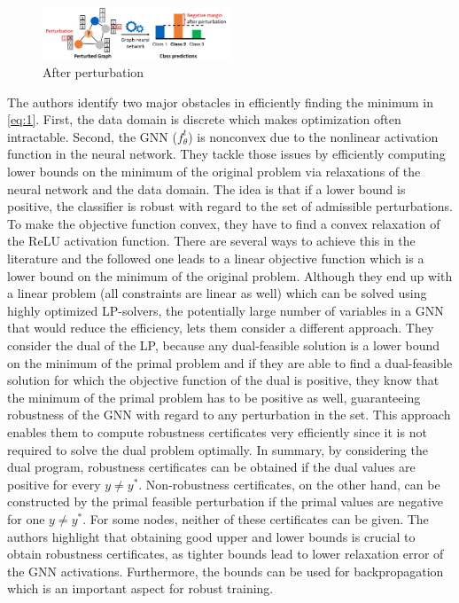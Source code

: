 \documentclass[a4paper,preprint]{sig-alternate}
\begin{document}
\begin{figure}[h]
    \centering
    \includegraphics[width=0.5\textwidth]{img/after_pert.png}
    \caption{After perturbation \cite{Zuegner_2019}}
    \label{fig:after_pert}
\end{figure}

The authors identify two major obstacles in efficiently finding the minimum in \ref{eq:1}.
First, the data domain is discrete which makes optimization often intractable. Second, the GNN ($f_{\theta}^t$) is nonconvex
due to the nonlinear activation function in the neural network. They tackle those issues by efficiently computing lower bounds
on the minimum of the original problem via relaxations of the neural network and the data domain.
The idea is that if a lower bound is positive, the classifier is robust with regard to the set of admissible perturbations.
To make the objective function convex, they have to find a convex relaxation of the ReLU activation function. There are several ways to achieve this in the literature and the followed one leads to a linear objective function which is a lower bound on the minimum of the original problem.
Although they end up with a linear problem (all constraints are linear as well) which can be solved using highly optimized LP-solvers,
the potentially large number of variables in a GNN that would reduce the efficiency, lets them consider a different approach.
They consider the dual of the LP, because any dual-feasible solution is a lower bound on the minimum of the primal problem
and if they are able to find a dual-feasible solution for which the objective function of the dual is positive,
they know that the minimum of the primal problem has to be positive as well, guaranteeing robustness of the GNN with regard to any perturbation in the set.
This approach enables them to compute robustness certificates very efficiently since it is not required to solve the dual problem optimally.\newline
In summary, by considering the dual program, robustness certificates can be obtained if the dual values are positive for every $y \neq y^*$.
Non-robustness certificates, on the other hand, can be constructed by the primal feasible perturbation if the primal values are negative for
one $y \neq y^*$. For some nodes, neither of these certificates can be given. The authors highlight that obtaining good upper and lower bounds is 
crucial to obtain robustness certificates, as tighter bounds lead to lower relaxation error of the GNN activations. Furthermore, the bounds can 
be used for backpropagation which is an important aspect for robust training.\newline
\end{document}
